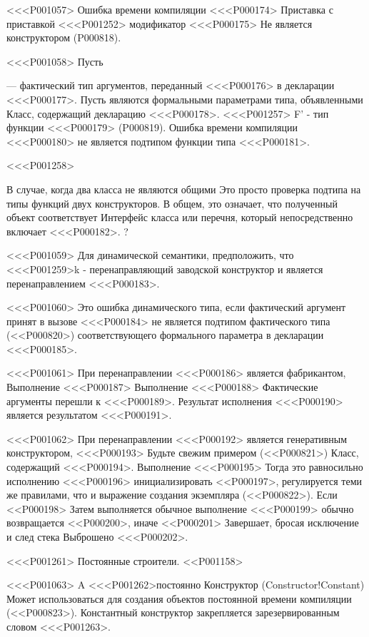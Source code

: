 {{{{{{{{{{{{{{{{{<<<P001057>%
Ошибка времени компиляции <<<P000174> Приставка с приставкой <<<P001252>{} модификатор
<<<P000175> Не является конструктором (P000818).

<<<P001058>%
Пусть } — фактический тип аргументов, переданный <<<P000176>
в декларации <<<P000177>.
Пусть  являются формальными параметрами типа, объявленными
Класс, содержащий декларацию <<<P000178>.
<<<P001257> F' - тип функции <<<P000179> (P000819).
Ошибка времени компиляции <<<P000180>
не является подтипом функции типа <<<P000181>.

<<<P001258>{%
В случае, когда два класса не являются общими
Это просто проверка подтипа на типы функций двух конструкторов.
В общем, это означает, что полученный объект соответствует%
Интерфейс класса или перечня, который непосредственно включает <<<P000182>.%
?

<<<P001059>%
Для динамической семантики,
предположить, что <<<P001259>{k} - перенаправляющий заводской конструктор
и  является перенаправлением <<<P000183>.

<<<P001060>%
Это ошибка динамического типа, если фактический аргумент принят в вызове <<<P000184>
не является подтипом фактического типа (<<P000820>)
соответствующего формального параметра в декларации <<<P000185>.

<<<P001061>%
При перенаправлении <<<P000186> является фабрикантом,
Выполнение <<<P000187> Выполнение <<<P000188>
Фактические аргументы перешли к <<<P000189>.
Результат исполнения <<<P000190> является результатом <<<P000191>.

<<<P001062>%
При перенаправлении <<<P000192> является генеративным конструктором,
<<<P000193> Будьте свежим примером (<<P000821>)
Класс, содержащий <<<P000194>.
Выполнение <<<P000195> Тогда это равносильно исполнению <<<P000196> инициализировать <<P000197>,
регулируется теми же правилами, что и выражение создания экземпляра
(<<P000822>).
Если <<P000198> Затем выполняется обычное выполнение <<<P000199>
обычно возвращается <<P000200>,
иначе <<P000201> Завершает, бросая исключение и след стека
Выброшено <<<P000202>.


<<<P001261> Постоянные строители.
<<P001158>

<<<P001063>%
A <<<P001262>{постоянно} Конструктор (Constructor!Constant)
Может использоваться для создания объектов постоянной времени компиляции (<<P000823>).
Константный конструктор закрепляется зарезервированным словом <<<P001263>.

}}}}}}}}}}}}}}}}}
